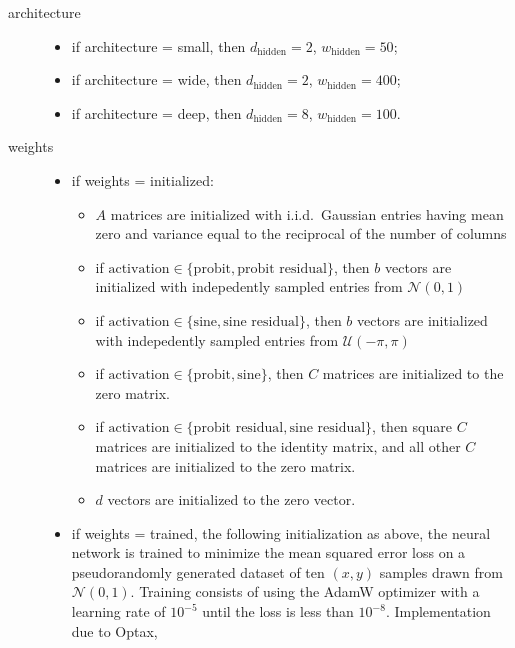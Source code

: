 \documentclass{article}
\begin{document}
\begin{description}
  \item[architecture] 
  \begin{itemize}
    \item if architecture = small, then \(d_\mathrm{hidden} = 2\), \(w_\mathrm{hidden} = 50\);
    \item if architecture = wide, then \(d_\mathrm{hidden} = 2\), \(w_\mathrm{hidden} = 400\);
    \item if architecture = deep, then \(d_\mathrm{hidden} = 8\), \(w_\mathrm{hidden} = 100\).
  \end{itemize}
  \item[weights]
  \begin{itemize}
    \item if weights = initialized:
    \begin{itemize}
      \item \(A\) matrices are initialized with i.i.d.~Gaussian entries having mean zero and variance equal to the reciprocal of the number of columns
      \item if \(\text{activation} \in \{\text{probit}, \text{probit residual}\}\), then \(b\) vectors are initialized with indepedently sampled entries from \(\mathcal N(0, 1)\)
      \item if \(\text{activation} \in \{\text{sine}, \text{sine residual}\}\), then \(b\) vectors are initialized with indepedently sampled entries from \(\mathcal U(-\pi, \pi)\)
      \item if \(\text{activation} \in \{\text{probit}, \text{sine}\}\), then \(C\) matrices are initialized to the zero matrix.
      \item if \(\text{activation} \in \{\text{probit residual}, \text{sine residual}\}\), then square \(C\) matrices are initialized to the identity matrix, and all other \(C\) matrices are initialized to the zero matrix.
      \item \(d\) vectors are initialized to the zero vector.
    \end{itemize}
    \item if weights = trained, the following initialization as above, the neural network is trained to minimize the mean squared error loss on a pseudorandomly generated dataset of ten \((x, y)\) samples drawn from \(\mathcal N(0, 1)\).
    Training consists of using the AdamW optimizer \citep{loshchilov_decoupled_2019} with a learning rate of \(10^{-5}\)  until the loss is less than \(10^{-8}\).
    Implementation due to Optax, \citet{deepmind_deepmind_2020}

\end{itemize}
\end{description}
\end{document}
